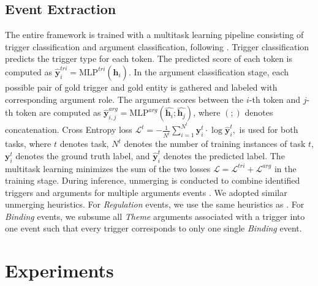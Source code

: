 \documentclass[11pt,a4paper]{article}
\begin{document}
\subsection{Event Extraction}
The entire framework is trained with a multitask learning pipeline consisting of trigger classification and argument classification, following \cite{han2019deep,han-etal-2019-joint}. Trigger classification predicts the trigger type for each token. The predicted score of each token is computed as $\bm{\hat{y}}^{tri}_{i} = \textrm{MLP}^{tri}(\bm{\hat{h}}_{i})$. In the argument classification stage, each possible pair of gold trigger and gold entity is gathered and labeled with corresponding argument role.\footnotemark{} The argument scores between the $i$-th token and $j$-th token are computed as $\bm{\hat{y}}^{arg}_{i,j} = \textrm{MLP}^{arg}(\hat{\bm{h}_{i}};\hat{\bm{h}_{j}})$, where $(;)$ denotes concatenation. Cross Entropy loss $\mathcal{L}^{t} = - \frac{1}{N^{t}}\sum_{i=1}^{N^{t}}  \bm{y}^{t}_{i} \cdot \log\bm{\hat{y}}^{t}_{i}, \label{eq:5}$  is used for both tasks, where $t$ denotes task, $N^{t}$ denotes the number of training instances of task $t$, $\bm{y}^{t}_{i}$ denotes the ground truth label, and $\bm{\hat{y}}^{t}_{i}$ denotes the predicted label. The multitask learning minimizes the sum of the two losses $\mathcal{L} = \mathcal{L}^{tri} + \mathcal{L}^{arg}$ in the training stage. During inference, unmerging is conducted to combine identified triggers and arguments for multiple arguments events \cite{bjorne-salakoski-2011-generalizing}. We adopted similar unmerging heuristics. For \textit{Regulation} events, we use the same heuristics as . For \textit{Binding} events, we subsume all \textit{Theme} arguments associated with a trigger into one event such that every trigger corresponds to only one single \textit{Binding} event. 









 \section{Experiments}
\end{document}
